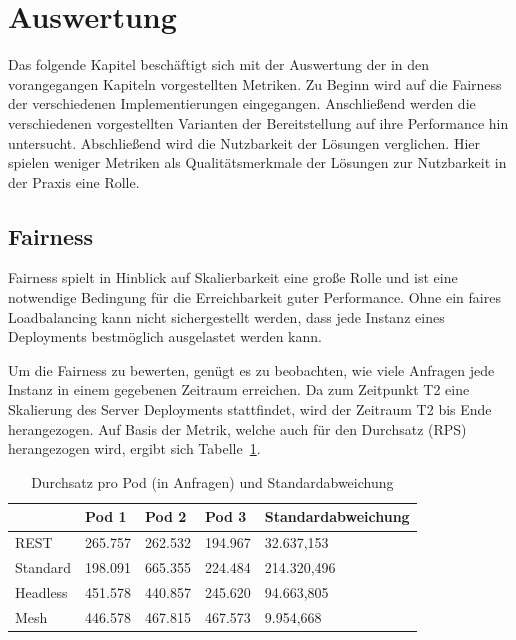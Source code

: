\newpage


\section{Auswertung}\label{sec:auswertung}

Das folgende Kapitel beschäftigt sich mit der Auswertung der in den vorangegangen Kapiteln vorgestellten Metriken.
Zu Beginn wird auf die Fairness der verschiedenen Implementierungen eingegangen.
Anschließend werden die verschiedenen vorgestellten Varianten der Bereitstellung auf ihre Performance hin untersucht.
Abschließend wird die Nutzbarkeit der Lösungen verglichen.
Hier spielen weniger Metriken als Qualitätsmerkmale der Lösungen zur Nutzbarkeit in der Praxis eine Rolle.

\subsection{Fairness}\label{subsec:fairness}

Fairness spielt in Hinblick auf Skalierbarkeit eine große Rolle und ist eine notwendige Bedingung für die Erreichbarkeit guter Performance.
Ohne ein faires Loadbalancing kann nicht sichergestellt werden, dass jede Instanz eines Deployments bestmöglich ausgelastet werden kann.

Um die Fairness zu bewerten, genügt es zu beobachten, wie viele Anfragen jede Instanz in einem gegebenen Zeitraum erreichen.
Da zum Zeitpunkt T2 eine Skalierung des Server Deployments stattfindet, wird der Zeitraum T2 bis Ende herangezogen.
Auf Basis der Metrik, welche auch für den Durchsatz (RPS) herangezogen wird, ergibt sich Tabelle~\ref{tab:requests}.

\begin{table}[H]
    \centering
    \begin{tabular}{|l|l|l|l|l|}
        \hline
        & Pod 1  & Pod 2  & Pod 3  & Standardabweichung \\ \hline
        REST     & 265.757 & 262.532 & 194.967 & 32.637,153          \\ \hline
        Standard & 198.091 & 665.355 & 224.484 & 214.320,496         \\ \hline
        Headless & 451.578 & 440.857 & 245.620 & 94.663,805          \\ \hline
        Mesh     & 446.578 & 467.815 & 467.573 & 9.954,668           \\ \hline
    \end{tabular}
    \caption{Durchsatz pro Pod (in Anfragen) und Standardabweichung}
    \label{tab:requests}
\end{table}

